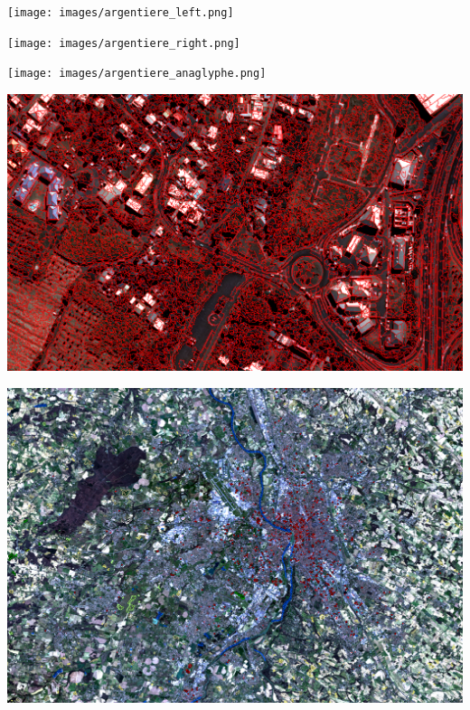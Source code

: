 \documentclass[8pt]{beamer}
\begin{document}
\vspace*{-6.5mm}
\begin{frame}[plain]
\hspace*{-11mm}
    \texttt{[image: images/argentiere\_left.png]}
\end{frame}

\vspace*{-6.5mm}
\begin{frame}[plain]
\hspace*{-11mm}
    \texttt{[image: images/argentiere\_right.png]}
\end{frame}

\vspace*{-6.5mm}
\begin{frame}[plain]
\hspace*{-11mm}
    \texttt{[image: images/argentiere\_anaglyphe.png]}
\end{frame}

\vspace*{-6.5mm}
\begin{frame}[plain]
\hspace*{-11mm}
    \includegraphics[keepaspectratio,height=1.1\paperheight]{images/segmentation.png}
\end{frame}

\vspace*{-6.5mm}
\begin{frame}[plain]
\hspace*{-11mm}
    \includegraphics[keepaspectratio,height=1.1\paperheight]{../../Courses/2016/WorkshopGuide/Images/samples_selection.png}
\end{frame}
\end{document}
